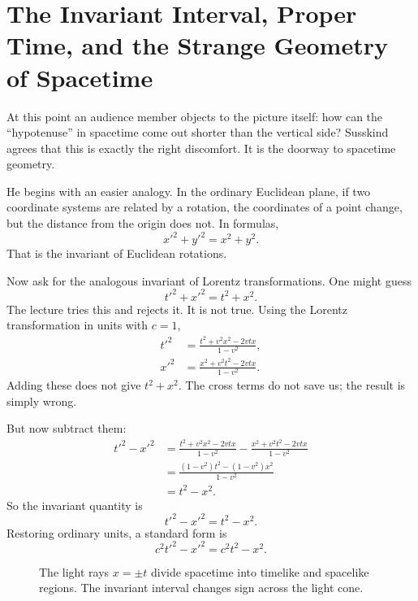 \section{The Invariant Interval, Proper Time, and the Strange Geometry of Spacetime}

At this point an audience member objects to the picture itself: how can the ``hypotenuse'' in spacetime come out shorter than the vertical side? Susskind agrees that this is exactly the right discomfort. It is the doorway to spacetime geometry.

He begins with an easier analogy. In the ordinary Euclidean plane, if two coordinate systems are related by a rotation, the coordinates of a point change, but the distance from the origin does not. In formulas,
\begin{equation}
x'^2+y'^2=x^2+y^2.
\end{equation}
That is the invariant of Euclidean rotations.

Now ask for the analogous invariant of Lorentz transformations. One might guess
\begin{equation}
t'^2+x'^2=t^2+x^2.
\end{equation}
The lecture tries this and rejects it. It is not true. Using the Lorentz transformation in units with \(c=1\),
\begin{align}
t'^2&=\frac{t^2+v^2x^2-2vtx}{1-v^2},\\
x'^2&=\frac{x^2+v^2t^2-2vtx}{1-v^2}.
\end{align}
Adding these does not give \(t^2+x^2\). The cross terms do not save us; the result is simply wrong.

But now subtract them:
\begin{align}
t'^2-x'^2
&=\frac{t^2+v^2x^2-2vtx}{1-v^2}
-\frac{x^2+v^2t^2-2vtx}{1-v^2}\\
&=\frac{(1-v^2)t^2-(1-v^2)x^2}{1-v^2}\\
&=t^2-x^2.
\end{align}
So the invariant quantity is
\begin{equation}
t'^2-x'^2=t^2-x^2.
\end{equation}
Restoring ordinary units, a standard form is
\begin{equation}
c^2t'^2-x'^2=c^2t^2-x^2.
\end{equation}

\begin{figure}
\centering
{}
\caption{The light rays \(x=\pm t\) divide spacetime into timelike and spacelike regions. The invariant interval changes sign across the light cone.}
\end{figure}

